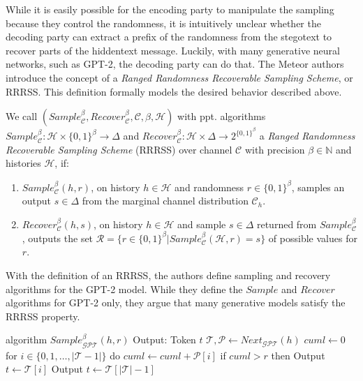 While it is easily possible for the encoding party to manipulate the sampling because they control the randomness, it is intuitively unclear whether the decoding party can extract a prefix of the randomness from the stegotext to recover parts of the hiddentext message.
Luckily, with many generative neural networks, such as GPT-2, the decoding party can do that.
The Meteor authors introduce the concept of a \emph{Ranged Randomness Recoverable Sampling Scheme}, or RRRSS.
This definition formally models the desired behavior described above.
\begin{definition}
  \label{def:rrrss}
  We call 
  $(Sample_{\mathcal{C}}^\beta, Recover_{\mathcal{C}}^\beta, \mathcal{C}, \beta, \mathcal{H})$ 
  with ppt. algorithms
  $Sample_{\mathcal{C}}^\beta \colon \mathcal{H} \times \{0,1\}^\beta \rightarrow \Delta$ 
  and 
  $Recover_{\mathcal{C}}^\beta \colon \mathcal{H} \times \Delta \rightarrow 2^{\{0,1\}^\beta}$
  a \emph{Ranged Randomness Recoverable Sampling Scheme} (RRRSS) over channel $\mathcal{C}$ with precision $\beta \in \mathbb{N}$ and histories $\mathcal{H}$, if:
  
  \begin{enumerate}
    \item $Sample_{\mathcal{C}}^\beta(h, r)$, on history $h \in \mathcal{H}$ and randomness $r \in \{0,1\}^\beta$, samples an output $s \in \Delta$ from the marginal channel distribution $\mathcal{C}_h$.
    \item $Recover_{\mathcal{C}}^\beta(h, s)$, on history $h \in \mathcal{H}$ and sample $s \in \Delta$ returned from $Sample_{\mathcal{C}}^\beta$, outputs the set $\mathcal{R} = \{ r \in \{0,1\}^\beta | Sample_{\mathcal{C}}^\beta(\mathcal{H}, r) = s \}$ of possible values for $r$.
  \end{enumerate}
\end{definition}
With the definition of an RRRSS, the authors define sampling and recovery algorithms for the GPT-2 model.
While they define the $Sample$ and $Recover$ algorithms for GPT-2 only, they argue that many generative models satisfy the RRRSS property.

\begin{Pseudocode}[caption={
RRRSS $Sample$ algorithm for GPT-2 \cite{Meteor2021}.
$Sample$ produces, given a history $h$ and a value $r$, the next token sampled according to $r$ from the distribution generated by $\mathcal{C}_h = Next_{\mathcal{GPT}}(h)$.
}]
algorithm $Sample_{\mathcal{GPT}}^\beta(  h, r)$
  Output: Token $t$
  $\mathcal{T}, \mathcal{P} \leftarrow Next_{\mathcal{GPT}}(h)$
  $cuml \leftarrow 0$
  for $i \in \{ 0, 1, \dots, | \mathcal{T} - 1 | \}$ do
    $cuml \leftarrow cuml + \mathcal{P}[i]$
    if $cuml > r$ then
      Output $t \leftarrow \mathcal{T}[i]$
  Output $t \leftarrow \mathcal{T}[|\mathcal{T}|-1]$
\end{Pseudocode}

